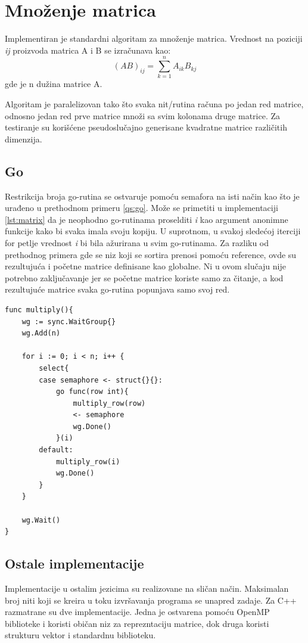 \documentclass[12pt,oneside]{memoir}
\begin{document}

\section{Množenje matrica}
Implementiran je standardni algoritam za množenje matrica. Vrednost na poziciji \textit{ij} proizvoda matrica A i B se izračunava kao: $$(AB)_{ij} = \sum_{k=1}^{n} A_{ik}B_{kj}$$ gde je n dužina matrice A. 

Algoritam je paralelizovan tako što svaka nit/rutina računa po jedan red matrice, odnosno jedan red prve matrice množi sa svim kolonama druge matrice. Za testiranje su korišćene pseudoslučajno generisane kvadratne matrice različitih dimenzija. 

\subsection{Go}
Restrikcija broja go-rutina se ostvaruje pomoću semafora na isti način kao što je urađeno u prethodnom primeru \ref{qs:go}. Može se primetiti u implementaciji \ref{lst:matrix} da je neophodno go-rutinama  proselditi \textit{i} kao argument anonimne funkcije kako bi svaka imala svoju kopiju. U suprotnom, u svakoj sledećoj iterciji for petlje vrednost \textit{i} bi bila ažurirana u svim go-rutinama. Za razliku od prethodnog primera gde se niz koji se sortira prenosi pomoću reference, ovde su rezultujuća i početne matrice definisane kao globalne. Ni u ovom slučaju nije potrebno zaključavanje jer se početne matrice koriste samo za čitanje, a kod rezultujuće matrice svaka go-rutina popunjava samo svoj red. 

\begin{center}
\begin{lstlisting}[caption=Go implementacija konkurentne funkcije za množenje matrica,label={lst:matrix},float, backgroundcolor=\color{background}]
func multiply(){
	wg := sync.WaitGroup{}
	wg.Add(n)

	for i := 0; i < n; i++ {
		select{
		case semaphore <- struct{}{}:
			go func(row int){
				multiply_row(row)
				<- semaphore
				wg.Done()
			}(i)
		default:
			multiply_row(i)
			wg.Done()
		}
	}

	wg.Wait()
}
\end{lstlisting}
\end{center}

\subsection{Ostale implementacije}
Implementacije u ostalim jezicima su realizovane na sličan način. Maksimalan broj niti koji se kreira u toku izvršavanja programa se unapred zadaje. Za C++ razmatrane su dve implementacije. Jedna je ostvarena pomoću OpenMP biblioteke i koristi običan niz za reprezntaciju matrice, dok druga koristi strukturu vektor i standardnu biblioteku.
\end{document}
